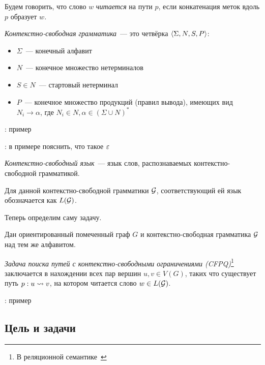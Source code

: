 \begin{definition}
Будем говорить, что слово $w$ \textit{читается} на пути $p$, если конкатенация меток вдоль $p$ образует $w$. 
\end{definition}

\begin{definition}
\textit{Контекстно-свободная грамматика}~--- это четвёрка $\langle \Sigma, N, S, P \rangle$:
\begin{itemize}
  \setlength\itemsep{-0.1em}
  \item $\Sigma$~--- конечный алфавит
  \item $N$~--- конечное множество нетерминалов
  \item $S \in N$~--- стартовый нетерминал
  \item $P$~--- конечное множество продукций (правил вывода), имеющих вид\\ $N_i \to \alpha$, где $N_i \in N, \alpha \in (\Sigma \cup N)^{*}$
\end{itemize}
\end{definition}

\TODO: пример

\TODO: в примере пояснить, что такое $\varepsilon$

\begin{definition}
\textit{Контекстно-свободный язык}~--- язык слов, распознаваемых контекстно-свободной грамматикой.

Для данной контекстно-свободной грамматики $\mathcal{G}$, соответствующий ей язык обозначается как $L(\mathcal{G})$. 
\end{definition}

Теперь определим саму задачу.

\begin{definition}
  Дан ориентированный помеченный граф $G$ и контекстно-свободная грамматика $\mathcal{G}$ над тем же алфавитом.

  \textit{Задача поиска путей с контекстно-свободными ограничениями (CFPQ)}\footnote{В реляционной семантике~\cite{Hellings16}} заключается в нахождении всех пар вершин $u, v \in V(G)$, таких что существует путь $p: u \rightsquigarrow v$, на котором читается слово $w \in L(\mathcal{G})$.

\end{definition}

\TODO: пример


\subsection*{Цель и задачи}

